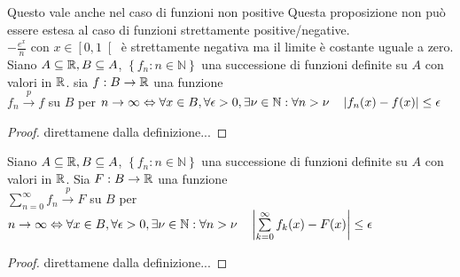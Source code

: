 \observation
Questo vale anche nel caso di funzioni non positive
\observation
Questa proposizione non può essere estesa al caso di funzioni strettamente positive/negative.\\
\example $	-\frac{e^x}{n}$ con $x\in\left[0,1\right[$ è strettamente negativa ma il limite è costante uguale a zero.
\proposition
Siano $A\subseteq \mathbb{R}, B\subseteq A$, $\left\{f_n:n\in\mathbb{N}\right\}$ una successione di funzioni definite su $A$ con valori in $ \mathbb{R}$. sia $f:B\to \mathbb{R}$ una funzione\\
$f_n\overset{p}{\to}f$ su $B$ per $n\to\infty \Leftrightarrow \forall x\in B,\forall \epsilon >0,\exists\nu\in\mathbb{N}:\forall n>\nu \quad \left|f_n(x)-f(x)\right|\le \epsilon$
\begin{proof}
	direttamene dalla definizione...
\end{proof}
\proposition
Siano $A\subseteq \mathbb{R}, B\subseteq A$, $\left\{f_n:n\in\mathbb{N}\right\}$ una successione di funzioni definite su $A$ con valori in $ \mathbb{R}$. Sia $F:B\to \mathbb{R}$ una funzione\\
$\sum\limits_{n=0}^{\infty}f_n\overset{p}{\to}F$ su $B$ per $n\to\infty \Leftrightarrow \forall x\in B,\forall \epsilon >0,\exists\nu\in\mathbb{N}:\forall n>\nu \quad \left|\sum\limits_{k=0}^{\infty}f_k(x)-F(x)\right|\le \epsilon$
\begin{proof}
	direttamene dalla definizione...
\end{proof}

